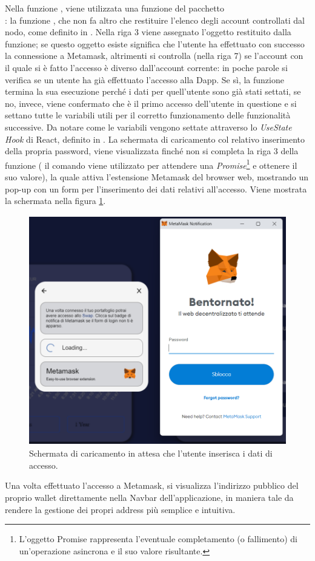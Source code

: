 Nella funzione \textcourier{\ref{onLogin}\textcolor{red}{()}}, viene utilizzata una funzione del pacchetto \\: la funzione , che non fa altro che restituire l'elenco degli account controllati dal nodo, come definito in \cite{web3API}. Nella riga 3 viene assegnato l'oggetto restituito dalla funzione; se questo oggetto esiste significa che l'utente ha effettuato con successo la connessione a Metamask, altrimenti si controlla (nella riga 7) se l'account con il quale si è fatto l'accesso è diverso dall'account corrente: in poche parole si verifica se un utente ha già effettuato l'accesso alla Dapp. Se sì, la funzione termina la sua esecuzione perché i dati per quell'utente sono già stati settati, se no, invece, viene confermato che è il primo accesso dell'utente in questione e si settano tutte le variabili utili per il corretto funzionamento delle funzionalità successive. 
Da notare come le variabili vengono settate attraverso lo \textit{UseState Hook} di React, definito in \cite{React}. 
La schermata di caricamento col relativo inserimento della propria password, viene visualizzata finché non si completa la riga 3 della funzione \textcourier{\ref{onLogin}\textcolor{red}{()}} ( il comando  viene utilizzato per attendere una \textit{Promise}\footnote{L'oggetto Promise rappresenta l'eventuale completamento (o fallimento) di un'operazione asincrona e il suo valore risultante.} e ottenere il suo valore), la quale attiva l'estensione Metamask del browser web, mostrando un pop-up con un form per l'inserimento dei dati relativi all'accesso. Viene mostrata la schermata nella figura \ref{caricamento_login}.

\begin{figure}[h]
    \centering
    \includegraphics[width=13.5cm,height=10cm]{Immagini/VisualizzazioneMetamask.png}
    \caption[Schermata di caricamento per l'inserimento dei dati di accesso]{Schermata di caricamento in attesa che l'utente inserisca i dati di accesso.}
    \label{caricamento_login}
\end{figure}
Una volta effettuato l'accesso a Metamask, si visualizza l'indirizzo pubblico del proprio wallet direttamente nella Navbar dell'applicazione, in maniera tale da rendere la gestione dei propri address più semplice e intuitiva.

